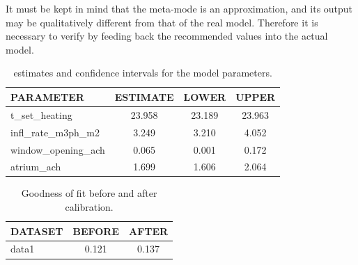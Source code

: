 \documentclass[a4paper]{report}\usepackage[]{graphicx}\usepackage[]{xcolor}
\begin{document}
It must be kept in mind that the meta-mode is an approximation, and its output may be 
	qualitatively different from that of the real model. Therefore it is necessary to verify by feeding back 
	the recommended values into the actual model.
\begin{table}[ht]
\centering
\caption{estimates and confidence intervals for the model parameters.} 
\label{tab:theta}
\begin{tabularx}{\textwidth}{X|ccc}
  \hline
PARAMETER & ESTIMATE & LOWER & UPPER \\ 
  \hline
t\_set\_heating & 23.958 & 23.189 & 23.963 \\ 
  infl\_rate\_m3ph\_m2 & 3.249 & 3.210 & 4.052 \\ 
  window\_opening\_ach & 0.065 & 0.001 & 0.172 \\ 
  atrium\_ach & 1.699 & 1.606 & 2.064 \\ 
   \hline
\end{tabularx}
\end{table}
\begin{table}[ht]
\centering
\caption{Goodness of fit before and after calibration.} 
\label{tab:gof}
\begin{tabularx}{\textwidth}{X|cc}
  \hline
DATASET & BEFORE & AFTER \\ 
  \hline
data1 & 0.121 & 0.137 \\ 
   \hline
\end{tabularx}
\end{table}
\end{document}
